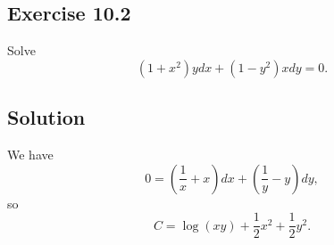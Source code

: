 \subsection*{Exercise 10.2}

Solve
\begin{equation*}
    (1 + x^2) y dx + (1 - y^2) x dy = 0.
\end{equation*}

\subsection*{Solution}

We have
\begin{equation*}
    0 = \left(\frac{1}{x} + x\right)dx + \left(\frac{1}{y} - y\right)dy,
\end{equation*}
so
\begin{equation*}
    C = \log(xy) + \frac{1}{2}x^2 + \frac{1}{2}y^2.
\end{equation*}
